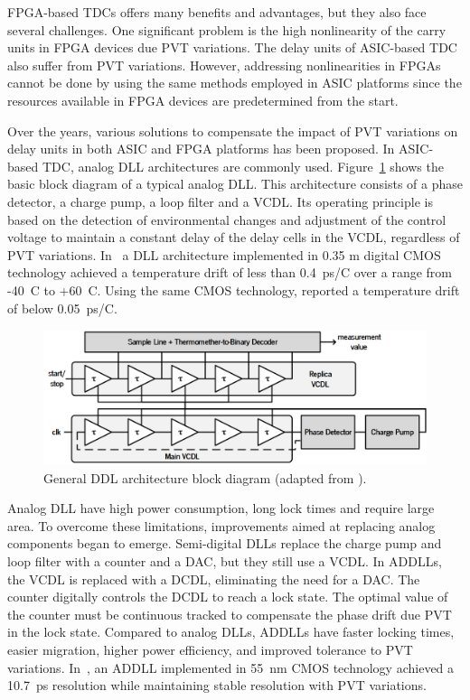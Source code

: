 
\gls{FPGA}-based \glspl{TDC} offers many benefits and advantages, but they also face several challenges. One significant problem is the high nonlinearity of the carry units in \gls{FPGA} devices due \gls{PVT} variations. The delay units of \gls{ASIC}-based \gls{TDC} also suffer from \gls{PVT} variations. However, addressing nonlinearities in \glspl{FPGA} cannot be done by using the same methods employed in \gls{ASIC} platforms since the resources available in \gls{FPGA} devices are predetermined from the start.

Over the years, various solutions to compensate the impact of \gls{PVT} variations on delay units in both \gls{ASIC} and \gls{FPGA} platforms has been proposed. In \gls{ASIC}-based \gls{TDC}, analog \gls{DLL} architectures are commonly used. Figure~\ref{fig:dll} shows the basic block diagram of a typical analog \gls{DLL}. This architecture consists of a phase detector, a charge pump, a loop filter and a \gls{VCDL}. Its operating principle is based on the detection of environmental changes and adjustment of the control voltage to maintain a constant delay of the delay cells in the \gls{VCDL}, regardless of \gls{PVT} variations. In~\citep{dll_2009} a \gls{DLL} architecture implemented in 0.35 \textmu m digital \gls{CMOS} technology achieved a temperature drift of less than 0.4~ps/\textdegree C over a range from -40~\textdegree C to +60~\textdegree C. Using the same \gls{CMOS} technology,  reported a temperature drift of below 0.05~ps/\textdegree C.

\begin{figure}[ht!]
	\centering
	\includegraphics[width=.8\textwidth]{img/02_StateofArt/dll.png}
	\caption{General DDL architecture block diagram (adapted from \citep{addll_review}).}
	\label{fig:dll}
\end{figure}

Analog \gls{DLL} have high power consumption, long lock times and require large area. To overcome these limitations, improvements aimed at replacing analog components began to emerge. Semi-digital \glspl{DLL} replace the charge pump and loop filter with a counter and a \gls{DAC}, but they still use a \gls{VCDL}. In \glspl{ADDLL}, the \gls{VCDL} is replaced with a \gls{DCDL}, eliminating the need for a \gls{DAC}. The counter digitally controls the \gls{DCDL} to reach a lock state. The optimal value of the counter must be continuous tracked to compensate the phase drift due \gls{PVT} in the lock state. Compared to analog \glspl{DLL}, \glspl{ADDLL} have faster locking times, easier migration, higher power efficiency, and improved tolerance to \gls{PVT} variations. In~\citep{addll_res}, an \gls{ADDLL} implemented in 55~nm \gls{CMOS} technology achieved a 10.7~ps resolution while maintaining stable resolution with \gls{PVT} variations.

